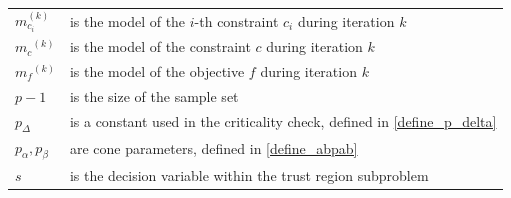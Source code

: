 \documentclass{article}
\theoremstyle{case}
\numberwithin{theorem}{subsection}
\newcommand{\mcik}{{{m}^{(k)}_{c_i}}}
\newcommand{\mck}{{{m}_{c}}^{(k)}}
\newcommand{\mfk}{{{m}_f}^{(k)}}
\begin{document}
\begin{longtable}{| p{} | p{} |}
$\mcik$ & is the model of the $i$-th constraint $c_i$ during iteration $k$\\ %
$\mck$ & is the model of the constraint $c$ during iteration $k$\\ %
$\mfk$ & is the model of the objective $f$ during iteration $k$\\ %
$p-1$ & is the size of the sample set \\ %
$p_{\Delta}$ & is a constant used in the criticality check, defined in  \cref{define_p_delta} \\ %
$p_{\alpha}, p_{\beta}$ & are cone parameters, defined in \cref{define_abpab} \\ %
$s$ & is the decision variable within the trust region subproblem \\ %

\end{longtable}
\end{document}

